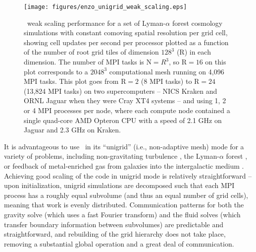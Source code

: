 \begin{figure}
\begin{center}
\texttt{[image: figures/enzo\_unigrid\_weak\_scaling.eps]}
\caption{\enzo\ weak scaling performance for a set of Lyman-$\alpha$
forest cosmology simulations with constant comoving spatial resolution
per grid cell, showing cell updates per second per processor 
plotted as a function of the number of root grid tiles of dimension
$128^3$ (R) in each dimension.  The number of MPI tasks is N$ = R^3$,
so R$ = 16$ on this plot corresponds to a $2048^3$ computational mesh
running on 4,096 MPI tasks.  This plot goes from R$ = 2$ (8 MPI tasks)
to R$ = 24$ (13,824 MPI tasks) on two supercomputers -- NICS Kraken
and ORNL Jaguar when they were Cray XT4 systems -- and using 1, 2 or 4
MPI processes per node, where each compute node contained a single
quad-core AMD Opteron CPU with a speed of 2.1 GHz on Jaguar and 2.3
GHz on Kraken.}
\label{fig.uniscale}
\end{center}
\end{figure}

It is advantageous to use \enzo\ in its ``unigrid'' (i.e.,
non-adaptive mesh) mode for a variety of problems, including
non-gravitating turbulence
\citep[e.g.,][]{2002ApJ...569L.127K,Kritsuk04}, the Lyman-$\alpha$ forest
\citep{2005MNRAS.361...70J,2009MNRAS.399.1934P}, or feedback of
metal-enriched gas from galaxies into the intergalactic medium
\citep{2004ApJ...601L.115N,2011ApJ...731....6S}.  Achieving good
scaling of the code in unigrid mode is relatively straightforward --
upon initialization, unigrid simulations are decomposed such that each
MPI process has a roughly equal subvolume (and thus an equal number of grid
cells), meaning that work is evenly distributed.  Communication
patterns for both the gravity solve (which uses a fast Fourier
transform) and the fluid solves (which transfer boundary information
between subvolumes) are predictable and straightforward, and
rebuilding of the grid hierarchy does not take place, removing a
substantial global operation and a great deal of communication.

